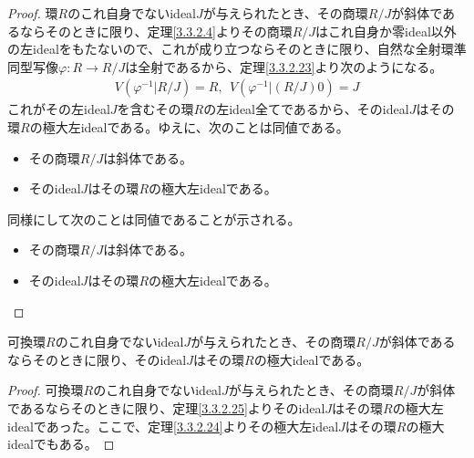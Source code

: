 \documentclass[dvipdfmx]{jsarticle}
\begin{document}
\begin{proof}
環$R$のこれ自身でないideal$J$が与えられたとき、その商環${R}/{J}$が斜体であるならそのときに限り、定理\ref{3.3.2.4}よりその商環${R}/{J}$はこれ自身か零ideal以外の左idealをもたないので、これが成り立つならそのときに限り、自然な全射環準同型写像$\varphi:R \rightarrow {R}/{J}$は全射であるから、定理\ref{3.3.2.23}より次のようになる。
\begin{align*}
V\left( \varphi^{- 1}|{R}/{J} \right) = R,\ \ V\left( \varphi^{- 1}|\left( {R}/{J} \right)0 \right) = J
\end{align*}
これがその左ideal$J$を含むその環$R$の左ideal全てであるから、そのideal$J$はその環$R$の極大左idealである。ゆえに、次のことは同値である。
\begin{itemize}
\item
  その商環${R}/{J}$は斜体である。
\item
  そのideal$J$はその環$R$の極大左idealである。
\end{itemize}
同様にして次のことは同値であることが示される。
\begin{itemize}
\item
  その商環${R}/{J}$は斜体である。
\item
  そのideal$J$はその環$R$の極大左idealである。
\end{itemize}
\end{proof}
\begin{thm}\label{3.3.2.26}
可換環$R$のこれ自身でないideal$J$が与えられたとき、その商環${R}/{J}$が斜体であるならそのときに限り、そのideal$J$はその環$R$の極大idealである。
\end{thm}
\begin{proof}
可換環$R$のこれ自身でないideal$J$が与えられたとき、その商環${R}/{J}$が斜体であるならそのときに限り、定理\ref{3.3.2.25}よりそのideal$J$はその環$R$の極大左idealであった。ここで、定理\ref{3.3.2.24}よりその極大左ideal$J$はその環$R$の極大idealでもある。
\end{proof}
\end{document}
